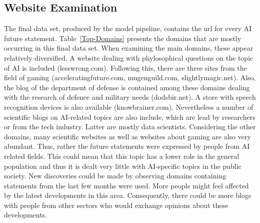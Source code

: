 \subsection{Website Examination}

The final data set, produced by the model pipeline, contains the url for every AI future statement.
Table~\ref{Top-Domains} presents the domains that are mostly occurring in this final data set.
When examining the main domains, these appear relatively  diversified.
A website dealing with phylosophical questions on the topic of AI is included (lesswrong.com).
Following this, there are three sites from the field of gaming (acceleratingfuture.com, mugenguild.com, slightlymagic.net).
Also, the blog of the department of defense is contained among these domains dealing with the research of defence and military needs (dodsbir.net).
A store with speech recognition devices is also available (knowbrainer.com).
Nevertheless a number of scientific blogs on AI-related topics are also include, which are lead by researchers or from the tech industry.
Latter are mostly data scientists.
Considering the other domains, many scientific websites as well as websites about gaming are also very abundant.
Thus, rather the future statements were expressed by people from AI related fields.
This could mean that this topic has a lower role in the general population and thus it is dealt very little with AI-specific topics in the public society.
New discoveries could be made by observing domains containing statements from the last few months were used.
More people might feel affected by the latest developments in this area.
Consequently, there could be more blogs with people from other sectors who would exchange opinions about these developments.

